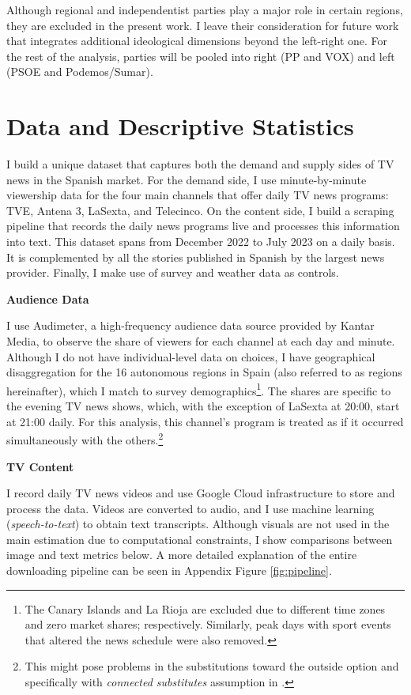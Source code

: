 \documentclass[12pt]{article}
\begin{document}
	Although regional and independentist parties play a major role in certain regions, they are excluded in the present work. I leave their consideration for future work that integrates additional ideological dimensions beyond the left-right one. 	For the rest of the analysis, parties will be pooled into right (PP and VOX) and left (PSOE and Podemos/Sumar). 
	
	\section{Data and Descriptive Statistics}
	\label{section:data}
	
	I build a unique dataset that captures both the demand and supply sides of TV news in the Spanish market. For the demand side, I use minute-by-minute viewership data for the four main channels that offer daily TV news programs: TVE, Antena 3, LaSexta, and Telecinco. On the content side, I build a scraping pipeline that records the daily news programs live and processes this information into text. This dataset spans from December 2022 to July 2023 on a daily basis. It is complemented by all the stories published in Spanish by the largest news provider. Finally, I make use of survey and weather data as controls.
	
	\textbf{Audience Data}
	
	I use Audimeter, a high-frequency audience data source provided by Kantar Media, to observe the share of viewers for each channel at each day and minute. Although I do not have individual-level data on choices, I have geographical disaggregation for the 16 autonomous regions in Spain (also referred to as regions hereinafter), which I match to survey demographics\footnote{The Canary Islands and La Rioja are excluded due to different time zones and zero market shares; respectively. Similarly, peak days with sport events that altered the news schedule were also removed.}. The shares are specific to the evening TV news shows, which, with the exception of LaSexta at 20:00, start at 21:00 daily. For this analysis, this channel’s program is treated as if it occurred simultaneously with the others.\footnote{This might pose problems in the substitutions toward the outside option and specifically with  \textit{connected substitutes} assumption in \cite{gandhi2019measuring}.  }
	
	\textbf{TV Content}
	
	I record daily TV news videos and use Google Cloud infrastructure to store and process the data. Videos are converted to audio, and I use machine learning (\textit{speech-to-text}) to obtain text transcripts. Although visuals are not used in the main estimation due to computational constraints, I show comparisons between image and text metrics below. A more detailed explanation of the entire downloading pipeline can be seen in Appendix Figure \ref{fig:pipeline}.
	
\end{document}
